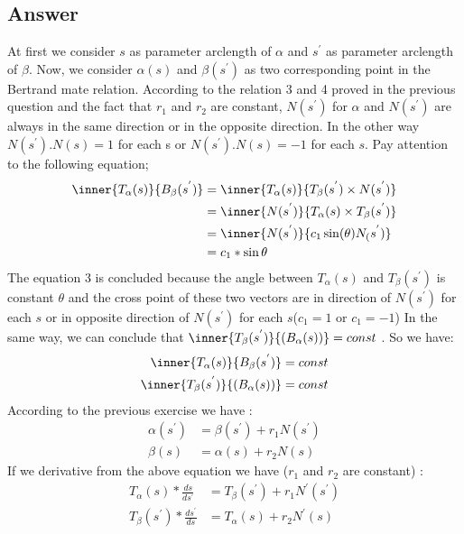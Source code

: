 \documentclass[
	12pt, %
]{fphw}
\theoremstyle{plain}
\begin{document}
\subsection*{Answer}
\setcounter{assumption}{0}
\setcounter{equation}{0}
At first we consider $s$ as parameter arclength of $\alpha$ and $s^{'}$ as parameter arclength of $\beta$. Now, we consider $\alpha(s)$ and $\beta(s^{'})$ as two corresponding point in the Bertrand mate relation.
According to the relation 3 and 4 proved in the previous question and the fact that $r_{1}$ and $r_{2}$ are constant, $N(s^{'})$ for $\alpha$ and $N(s^{'})$ are always in the same direction or in the opposite direction. In the other way $N(s^{'}).N(s) = 1$ for each s or $N(s^{'}).N(s) = -1$ for each $s$.
Pay attention to the following equation;
\begin{align}
     \inner{T_{\alpha}(s)}{B_{\beta}(s^{'})} &= \inner{T_{\alpha}(s)}{T_{\beta}(s^{'})\times N(s^{'})}\\
                                             &= \inner{N(s^{'})}{T_{\alpha}(s) \times T_{\beta}(s^{'})}\\
                                             &= \inner{N(s^{'})}{c_{1}\sin(\theta)N_(s^{'})}\\
                                             &= c_1*\sin\theta
\end{align}
The equation 3 is concluded because the angle between $T_{\alpha}(s)$ and $T_{\beta}(s^{'})$ is constant $\theta$ and the cross point of these two vectors are in direction of $N(s^{'})$ for each $s$ or in opposite direction of $N(s^{'})$ for each $s$($c_{1} =  1$ or $c_{1} = -1$) 
In the same way, we can conclude that $\inner{T_{\beta}(s^{'})}{(B_{\alpha}(s))} = const$ . So we have:
\begin{align}
     \inner{T_{\alpha}(s)}{B_{\beta}(s^{'})} & = const\\
     \inner{T_{\beta}(s^{'})}{(B_{\alpha}(s))} & = const 
\end{align}
According to the previous exercise we have :
\begin{align}
     \alpha(s^{'}) &= \beta(s^{'}) + r_{1} N(s^{'}) \\
     \beta(s)  &= \alpha(s) + r_{2} N(s)
\end{align}
If we derivative from the above equation we have ($r_{1}$ and $r_{2}$ are constant) :
\begin{align}
     T_{\alpha}(s)*\frac{ds}{ds^{'}} &= T_{\beta}(s^{'}) + r_{1} N^{'}(s^{'}) \\
     T_{\beta}(s^{'})*\frac{ds^{'}}{ds}  &= T_{\alpha}(s) + r_{2} N^{'}(s)
\end{align}
\end{document}
